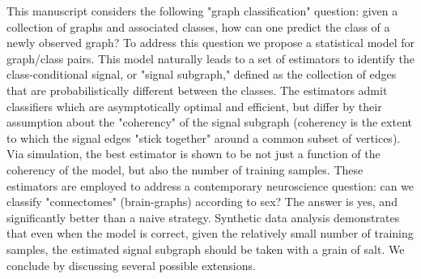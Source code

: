This manuscript considers the following "graph classification" question: given a collection of graphs and associated classes, how can one predict the class of a newly observed graph?  To address this question we propose a statistical model for graph/class pairs.  This model naturally leads to a set of estimators to identify the class-conditional signal, or "signal subgraph," defined as the collection of edges that are probabilistically different between the classes. The estimators admit classifiers which are asymptotically optimal and efficient, but differ by their assumption about the "coherency" of the signal subgraph (coherency is the extent to which the signal edges "stick together" around a common subset of vertices). Via simulation, the best estimator is shown to be not just a function of the coherency of the model, but also the number of training samples.  These estimators are employed to address a contemporary neuroscience question: can we classify "connectomes" (brain-graphs) according to sex?  The answer is yes, and significantly better than a naive strategy.  Synthetic data analysis demonstrates that even when the model is correct, given the relatively small number of training samples, the estimated signal subgraph should be taken with a grain of salt.  We conclude by discussing several possible extensions.
